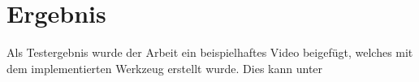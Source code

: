 \section{Ergebnis}

Als Testergebnis wurde der Arbeit ein beispielhaftes Video beigefügt, welches mit dem implementierten Werkzeug erstellt wurde. Dies kann unter %